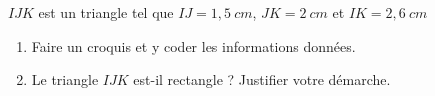 \begin{minipage}{0.99\linewidth}
\exo

$IJK$ est un triangle tel que $IJ=1,5~cm$, $JK=2~cm$ et $IK=2,6~cm$

		\begin{enumerate}
		\item Faire un croquis et y coder les informations données.
		\item Le triangle $IJK$ est-il rectangle ? Justifier votre démarche.
		\end{enumerate}	

\end{minipage}

\vspace{0.5cm}
